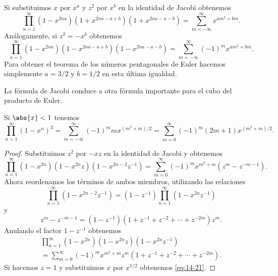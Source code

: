 \documentclass[12pt,a4paper]{book}
\begin{document}
    Si substituimos $x$ por $x^{a}$ y $z^{2}$ por $x^{b}$ en la identidad de Jacobi obtenemos
    \begin{equation*}
        \prod_{n=1}^{\infty}(1-x^{2na})(1+x^{2na-a+b})(1+x^{2na-a-b})=\sum_{m=-\infty}^{\infty}x^{am^{2}+bm}.
    \end{equation*}
    Análogamente, si $z^{2}=-x^{b}$ obtenemos
    \begin{equation*}
        \prod_{n=1}^{\infty}(1-x^{2na})(1-x^{2na-a+b})(1-x^{2na-a-b})=\sum_{m=-\infty}^{\infty}(-1)^{m}x^{am^{2}+bm}.
    \end{equation*}
    Para obtener el teorema de los números pentagonales de Euler hacemos simplemente $a=3/2$ y
    $b=1/2$ en esta última igualdad.

    La fórmula de Jacobi conduce a otra fórmula importante para el cubo del producto de Euler.

    \begin{teorema}\label{teo:14-7}
        Si $\abs{x}<1$ tenemos
        \begin{equation}\label{eq:14-21}
            \prod_{n=1}^{\infty}(1-x^{n})^{3}=\sum_{m=-\infty}^{\infty}(-1)^{m}mx^{(m^{2}+m)/2}=\sum_{m=0}^{\infty}(-1)^{m}(2m+1)x^{(m^{2}+m)/2}.
        \end{equation}
    \end{teorema}

    \begin{proof}
        Substituimos $z^{2}$ por $-xz$ en la identidad de Jacobi y obtenemos
        \begin{equation*}
            \prod_{n=1}^{\infty}(1-x^{2n})(1-x^{2n}z)(1-x^{2n-2}z^{-1})=\sum_{m=0}^{\infty}(-1)^{m}x^{m^{2}+m}\left(z^{m}-z^{-m-1}\right).
        \end{equation*}
        Ahora reordenamos los términos de ambos miembros, utilizando las relaciones
        \begin{equation*}
            \prod_{n=1}^{\infty}(1-x^{2n-2}z^{-1})=(1-z^{-1})\prod_{n=1}^{\infty}(1-x^{2n}z^{-1})
        \end{equation*}
        y
        \begin{equation*}
            z^{m}-z^{-m-1}=(1-z^{-1})(1+z^{-1}+z^{-2}+\cdots+z^{-2m})z^{m}.
        \end{equation*}
        Anulando el factor $1-z^{-1}$ obtenemos
        \begin{multline*}
            \prod_{n=1}^{\infty}(1-x^{2n})(1-x^{2n}z)(1-x^{2n}z^{-1})\\
            =\sum_{m=0}^{\infty}(-1)^{m}x^{m^{2}+m}z^{m}\left(1+z^{-1}+z^{-2}+\cdots+z^{-2m}\right).
        \end{multline*}
        Si hacemos $z=1$ y substituimos $x$ por $x^{1/2}$ obtenemos \eqref{eq:14-21}.
    \end{proof}
\end{document}
